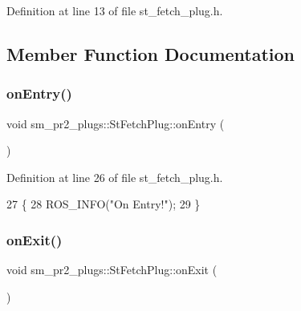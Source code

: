 Definition at line 13 of file st\+\_\+fetch\+\_\+plug.\+h.



\subsection{Member Function Documentation}
\mbox{\label{structsm__pr2__plugs_1_1StFetchPlug_a2f3ce8eeed2d552fa7abb3b13bc6a97c}} 
\subsubsection{\texorpdfstring{on\+Entry()}{onEntry()}}
{\footnotesize\ttfamily void sm\+\_\+pr2\+\_\+plugs\+::\+St\+Fetch\+Plug\+::on\+Entry (\begin{DoxyParamCaption}{ }\end{DoxyParamCaption})\hspace{0.3cm}{\ttfamily [inline]}}



Definition at line 26 of file st\+\_\+fetch\+\_\+plug.\+h.


\begin{DoxyCode}
27     \{
28         ROS\_INFO(\textcolor{stringliteral}{"On Entry!"});
29     \}
\end{DoxyCode}
\mbox{\label{structsm__pr2__plugs_1_1StFetchPlug_a31beba279787813c491a3460118c786d}} 
\subsubsection{\texorpdfstring{on\+Exit()}{onExit()}}
{\footnotesize\ttfamily void sm\+\_\+pr2\+\_\+plugs\+::\+St\+Fetch\+Plug\+::on\+Exit (\begin{DoxyParamCaption}{ }\end{DoxyParamCaption})\hspace{0.3cm}{\ttfamily [inline]}}



